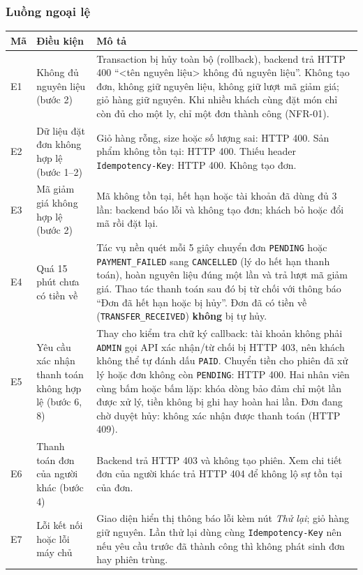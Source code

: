 \subsubsection{Luồng ngoại lệ}

\begin{longtable}{@{}p{0.8cm}p{3.6cm}p{11.6cm}@{}}
\toprule
\textbf{Mã} & \textbf{Điều kiện} & \textbf{Mô tả} \\
\midrule
\endhead
E1 & Không đủ nguyên liệu (bước 2)
  & Transaction bị hủy toàn bộ (rollback), backend trả HTTP 400 ``<tên nguyên liệu> không đủ nguyên liệu''. Không tạo đơn, không giữ nguyên liệu, không giữ lượt mã giảm giá; giỏ hàng giữ nguyên. Khi nhiều khách cùng đặt món chỉ còn đủ cho một ly, chỉ một đơn thành công (NFR-01). \\
E2 & Dữ liệu đặt đơn không hợp lệ (bước 1--2)
  & Giỏ hàng rỗng, size hoặc số lượng sai: HTTP 400. Sản phẩm không tồn tại: HTTP 400. Thiếu header \texttt{Idempotency-Key}: HTTP 400. Không tạo đơn. \\
E3 & Mã giảm giá không hợp lệ (bước 2)
  & Mã không tồn tại, hết hạn hoặc tài khoản đã dùng đủ 3 lần: backend báo lỗi và không tạo đơn; khách bỏ hoặc đổi mã rồi đặt lại. \\
E4 & Quá 15 phút chưa có tiền về
  & Tác vụ nền quét mỗi 5 giây chuyển đơn \texttt{PENDING} hoặc \texttt{PAYMENT\_FAILED} sang \texttt{CANCELLED} (lý do hết hạn thanh toán), hoàn nguyên liệu đúng một lần và trả lượt mã giảm giá. Thao tác thanh toán sau đó bị từ chối với thông báo ``Đơn đã hết hạn hoặc bị hủy''. Đơn đã có tiền về (\texttt{TRANSFER\_RECEIVED}) \textbf{không} bị tự hủy. \\
E5 & Yêu cầu xác nhận thanh toán không hợp lệ (bước 6, 8)
  & Thay cho kiểm tra chữ ký callback: tài khoản không phải \texttt{ADMIN} gọi API xác nhận/từ chối bị HTTP 403, nên khách không thể tự đánh dấu \texttt{PAID}. Chuyển tiền cho phiên đã xử lý hoặc đơn không còn \texttt{PENDING}: HTTP 400. Hai nhân viên cùng bấm hoặc bấm lặp: khóa dòng bảo đảm chỉ một lần được xử lý, tiền không bị ghi hay hoàn hai lần. Đơn đang chờ duyệt hủy: không xác nhận được thanh toán (HTTP 409). \\
E6 & Thanh toán đơn của người khác (bước 4)
  & Backend trả HTTP 403 và không tạo phiên. Xem chi tiết đơn của người khác trả HTTP 404 để không lộ sự tồn tại của đơn. \\
E7 & Lỗi kết nối hoặc lỗi máy chủ
  & Giao diện hiển thị thông báo lỗi kèm nút \emph{Thử lại}; giỏ hàng giữ nguyên. Lần thử lại dùng cùng \texttt{Idempotency-Key} nên nếu yêu cầu trước đã thành công thì không phát sinh đơn hay phiên trùng. \\
\bottomrule
\end{longtable}

